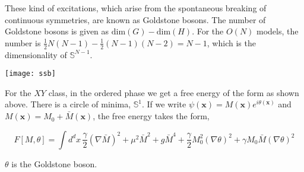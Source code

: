 \noindent These kind of excitations, which arise from the spontaneous breaking of continuous symmetries, are known as Goldstone bosons. The number of Goldstone bosons is given as $\text{dim}(G)-\text{dim}(H)$. For the $O(N)$ models, the number is $\frac{1}{2}N(N-1)-\frac{1}{2}(N-1)(N-2)=N-1$, which is the dimensionality of $\mathbb{S}^{N-1}$.\\

\begin{center}
    \texttt{[image: ssb]}
\end{center}

\noindent For the $XY$ class, in the ordered phase we get a free energy of the form as shown above. There is a circle of minima, $\mathbb{S}^1$. If we write $\psi(\boldsymbol{x})=M(\boldsymbol{x})e^{i\theta(\boldsymbol{x})}$ and $M(\boldsymbol{x})=M_0+\bar{M}(\boldsymbol{x})$, the free energy takes the form,

$$F[M,\theta]=\int d^dx\,\frac{\gamma}{2}(\nabla\bar{M})^2+\mu^2\bar{M}^2+g\bar{M}^4+\frac{\gamma}{2}M_0^2(\nabla\theta)^2+\gamma M_0\bar{M}(\nabla\theta)^2$$

\noindent $\theta$ is the Goldstone boson.